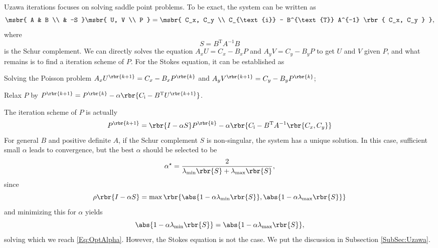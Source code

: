 \documentclass[english, nochinese]{pnote}
\begin{document}
Uzawa iterations focuses on solving saddle point problems. To be exact, the system can be written as
\begin{equation}
\msbr{ A & B \\ & -S } \msbr{ U, V \\ P } = \msbr{ C_x, C_y \\ C_{\text{i}} - B^{\text{T}} A^{-1} \rbr{ C_x, C_y } },
\end{equation}
where
\begin{equation}
S = B^{\text{T}} A^{-1} B
\end{equation}
is the Schur complement. We can directly solves the equation $ A_x U = C_x - B_x P $ and $ A_y V = C_y - B_y P $ to get $U$ and $V$ given $P$, and what remains is to find a iteration scheme of $P$. For the Stokes equation, it can be established as
\begin{partlist}
\item Solving the Poisson problem $ A_x U^{\rbr{ k + 1 }} = C_x - B_x P^{\rbr{k}} $ and $ A_y V^{\rbr{ k + 1 }} = C_y - B_y P^{\rbr{k}} $;
\item Relax $P$ by $ P^{\rbr{ k + 1 }} = P^{\rbr{k}} - \alpha \rbr{ C_{\text{i}} - B^{\text{T}} U^{\rbr{ k + 1 }} } $.
\end{partlist}
The iteration scheme of $P$ is actually
\begin{equation}
P^{\rbr{ k + 1 }} = \rbr{ I - \alpha S } P^{\rbr{k}} - \alpha \rbr{ C_{\text{i}} - B^{\text{T}} A^{-1} \rbr{ C_x, C_y } }
\end{equation}
For general $B$ and positive definite $A$, if the Schur complement $S$ is non-singular, the system has a unique solution. In this case, sufficient small $\alpha$ leads to convergence, but the best $\alpha$ should be selected to be
\begin{equation} \label{Eq:OptAlpha}
\alpha^{\star} = \frac{2}{ \lambda_{\text{min}} \rbr{S} + \lambda_{\text{max}} \rbr{S} },
\end{equation}
since
\begin{equation}
\rho \rbr{ I - \alpha S } = \max \rbr{ \abs{ 1 - \alpha \lambda_{\text{min}} \rbr{S} }, \abs{ 1 - \alpha \lambda_{\text{max}} \rbr{S} } }
\end{equation}
and minimizing this for $\alpha$ yields
\begin{equation}
\abs{ 1 - \alpha \lambda_{\text{min}} \rbr{S} } = \abs{ 1 - \alpha \lambda_{\text{max}} \rbr{S} },
\end{equation}
solving which we reach \eqref{Eq:OptAlpha}. However, the Stokes equation is not the case. We put the discussion in Subsection \ref{SubSec:Uzawa}.
\end{document}
